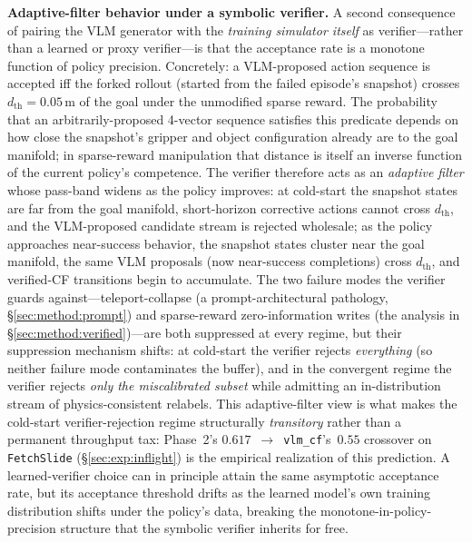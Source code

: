 \documentclass{article}
\begin{document}
\textbf{Adaptive-filter behavior under a symbolic verifier.}
A second consequence of pairing the VLM generator with the \emph{training
simulator itself} as verifier---rather than a learned or proxy
verifier---is that the acceptance rate is a monotone function of policy
precision. Concretely: a VLM-proposed action sequence is accepted iff the
forked rollout (started from the failed episode's snapshot) crosses
$d_{\text{th}}\!=\!0.05$\,m of the goal under the unmodified sparse
reward. The probability that an arbitrarily-proposed 4-vector sequence
satisfies this predicate depends on how close the snapshot's gripper and
object configuration already are to the goal manifold; in
sparse-reward manipulation that distance is itself an inverse function
of the current policy's competence. The verifier therefore acts as an
\emph{adaptive filter} whose pass-band widens as the policy improves: at
cold-start the snapshot states are far from the goal manifold,
short-horizon corrective actions cannot cross $d_{\text{th}}$, and the
VLM-proposed candidate stream is rejected wholesale; as the policy
approaches near-success behavior, the snapshot states cluster near the
goal manifold, the same VLM proposals (now near-success completions) cross
$d_{\text{th}}$, and verified-CF transitions begin to accumulate. The
two failure modes the verifier guards against---teleport-collapse (a
prompt-architectural pathology, \S\ref{sec:method:prompt}) and
sparse-reward zero-information writes (the analysis in
\S\ref{sec:method:verified})---are both suppressed at every regime, but
their suppression mechanism shifts: at cold-start the verifier rejects
\emph{everything} (so neither failure mode contaminates the buffer), and
in the convergent regime the verifier rejects \emph{only the
miscalibrated subset} while admitting an in-distribution stream of
physics-consistent relabels. This adaptive-filter view is what makes the
cold-start verifier-rejection regime structurally \emph{transitory}
rather than a permanent throughput tax: Phase~2's
$0.617$~$\to$~\texttt{vlm\_cf}'s~$0.55$ crossover on
\texttt{FetchSlide} (\S\ref{sec:exp:inflight}) is the empirical
realization of this prediction. A learned-verifier choice
\citep{chuck2025hint,wu2025rlvrworld} can in principle attain the same
asymptotic acceptance rate, but its acceptance threshold drifts as the
learned model's own training distribution shifts under the policy's data,
breaking the monotone-in-policy-precision structure that the symbolic
verifier inherits for free.
\end{document}
